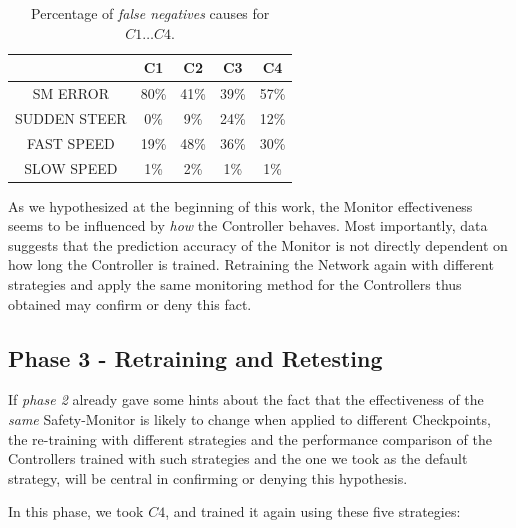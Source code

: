 \begin{table}[h!]
	\begin{center}
		\begin{tabular}{ |c|c|c|c|c| }
			\hline
			& C1 & C2 & C3 & C4 \\
			\hline
			SM ERROR & 80\% & 41\% & 39\% & 57\% \\
			\hline
			SUDDEN STEER & 0\% & 9\% & 24\% & 12\% \\
			\hline
			FAST SPEED & 19\% & 48\% & 36\% & 30\% \\
			\hline
			SLOW SPEED & 1\% & 2\% & 1\% & 1\% \\
			\hline
		\end{tabular}

	\caption{Percentage of \textsl{false negatives} causes for $C1\dots C4$.}
	\end{center}
\end{table}

As we hypothesized at the beginning of this work, the Monitor effectiveness seems to be influenced by \textsl{how} the Controller behaves. Most importantly, data suggests that the prediction accuracy of the Monitor is not directly dependent on how long the Controller is trained. Retraining the Network again with different strategies and apply the same monitoring method for the Controllers thus obtained may confirm or deny this fact.




\subsection{Phase 3 - Retraining and Retesting}

If \textsl{phase 2} already gave some hints about the fact that the effectiveness of the \textsl{same} Safety-Monitor is likely to change when applied to different Checkpoints, the re-training with different strategies and the performance comparison of the Controllers trained with such strategies and the one we took as the default strategy, will be central in confirming or denying this hypothesis.

In this phase, we took $C4$, and trained it again using these five strategies:

